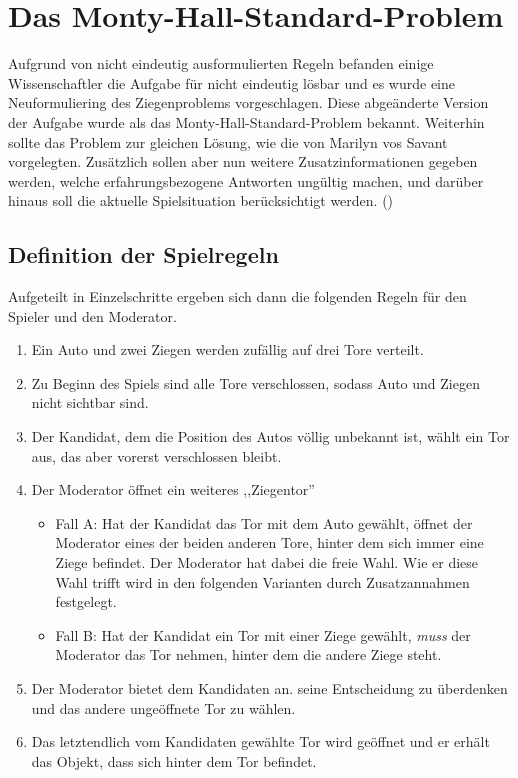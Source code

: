 \chapter{Das Monty-Hall-Standard-Problem}

Aufgrund von nicht eindeutig ausformulierten Regeln befanden einige Wissenschaftler die Aufgabe für nicht eindeutig lösbar und es wurde eine Neuformuliering des
Ziegenproblems vorgeschlagen. Diese abgeänderte Version der Aufgabe wurde als das Monty-Hall-Standard-Problem bekannt. Weiterhin sollte das Problem zur gleichen
Lösung, wie die von Marilyn vos Savant vorgelegten. Zusätzlich sollen aber nun weitere Zusatzinformationen gegeben werden, welche erfahrungsbezogene Antworten ungültig
machen, und darüber hinaus soll die aktuelle Spielsituation berücksichtigt werden. (\cite{Mueser:1999})

\section{Definition der Spielregeln}

Aufgeteilt in Einzelschritte ergeben sich dann die folgenden Regeln für den Spieler und den Moderator.
\begin{enumerate}
    \item Ein Auto und zwei Ziegen werden zufällig auf drei Tore verteilt.
    \item Zu Beginn des Spiels sind alle Tore verschlossen, sodass Auto und Ziegen nicht sichtbar sind.
    \item Der Kandidat, dem die Position des Autos völlig unbekannt ist, wählt ein Tor aus, das aber vorerst verschlossen bleibt.
    \item Der Moderator öffnet ein weiteres ,,Ziegentor''\begin{itemize}
              \item Fall A: Hat der Kandidat das Tor mit dem Auto gewählt, öffnet der Moderator eines der beiden anderen Tore, hinter dem sich immer eine Ziege befindet.
                    Der Moderator hat dabei die freie Wahl. Wie er diese Wahl trifft wird in den folgenden Varianten durch Zusatzannahmen festgelegt.
              \item Fall B: Hat der Kandidat ein Tor mit einer Ziege gewählt, \textit{muss} der Moderator das Tor nehmen, hinter dem die andere Ziege steht.
          \end{itemize}
    \item Der Moderator bietet dem Kandidaten an. seine Entscheidung zu überdenken und das andere ungeöffnete Tor zu wählen.
    \item Das letztendlich vom Kandidaten gewählte Tor wird geöffnet und er erhält das Objekt, dass sich hinter dem Tor befindet.
\end{enumerate}

